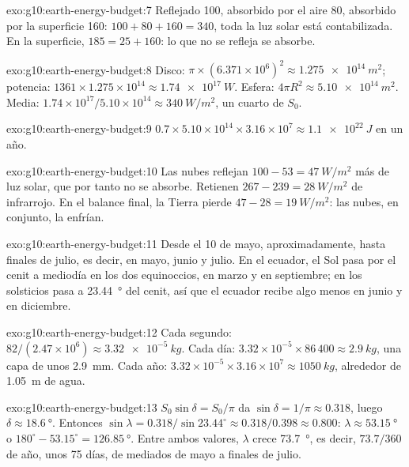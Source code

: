 \begin{solution}{exo:g10:earth-energy-budget:7}
Reflejado 100, absorbido por el aire 80, absorbido por la superficie 160:
$100 + 80 + 160 = 340$, toda la luz solar está contabilizada. En la
superficie, $185 = 25 + 160$: lo que no se refleja se absorbe.
\end{solution}

\begin{solution}{exo:g10:earth-energy-budget:8}
Disco: $\pi \times (6.371\times10^6)^2 \approx \qty{1.275e14}{m^2}$; potencia:
$1361 \times 1.275\times10^{14} \approx \qty{1.74e17}{W}$. Esfera: $4\pi
R^2 \approx \qty{5.10e14}{m^2}$. Media: $1.74\times10^{17}/5.10\times
10^{14} \approx \qty{340}{W/m^2}$, un cuarto de $S_0$.
\end{solution}

\begin{solution}{exo:g10:earth-energy-budget:9}
$0.7 \times 5.10\times10^{14} \times 3.16\times10^7 \approx
\qty{1.1e22}{J}$ en un año.
\end{solution}

\begin{solution}{exo:g10:earth-energy-budget:10}
Las nubes reflejan $100 - 53 = \qty{47}{W/m^2}$ más de luz solar, que por
tanto no se absorbe. Retienen $267 - 239 = \qty{28}{W/m^2}$ de infrarrojo.
En el balance final, la Tierra pierde $47 - 28 = \qty{19}{W/m^2}$: las
nubes, en conjunto, la enfrían.
\end{solution}

\begin{solution}{exo:g10:earth-energy-budget:11}
Desde el 10 de mayo, aproximadamente, hasta finales de julio, es decir, en
mayo, junio y julio. En el ecuador, el Sol pasa por el cenit a mediodía en
los dos equinoccios, en marzo y en septiembre; en los solsticios pasa a
\qty{23.44}{\degree} del cenit, así que el ecuador recibe algo menos en junio
y en diciembre.
\end{solution}

\begin{solution}{exo:g10:earth-energy-budget:12}
Cada segundo: $82/(2.47\times10^6) \approx \qty{3.32e-5}{kg}$. Cada día:
$3.32\times10^{-5} \times 86\,400 \approx \qty{2.9}{kg}$, una capa de unos
\qty{2.9}{mm}. Cada año: $3.32\times10^{-5} \times 3.16\times10^7 \approx
\qty{1050}{kg}$, alrededor de \qty{1.05}{m} de agua.
\end{solution}

\begin{solution}{exo:g10:earth-energy-budget:13}
$S_0 \sin\delta = S_0/\pi$ da $\sin\delta = 1/\pi \approx 0.318$, luego
$\delta \approx \qty{18.6}{\degree}$. Entonces $\sin\lambda = 0.318/\sin 23.44^\circ
\approx 0.318/0.398 \approx 0.800$: $\lambda \approx \qty{53.15}{\degree}$ o
$180^\circ - 53.15^\circ = \qty{126.85}{\degree}$. Entre ambos valores,
$\lambda$ crece \qty{73.7}{\degree}, es decir, $73.7/360$ de año, unos
\num{75} días, de mediados de mayo a finales de julio.
\end{solution}

